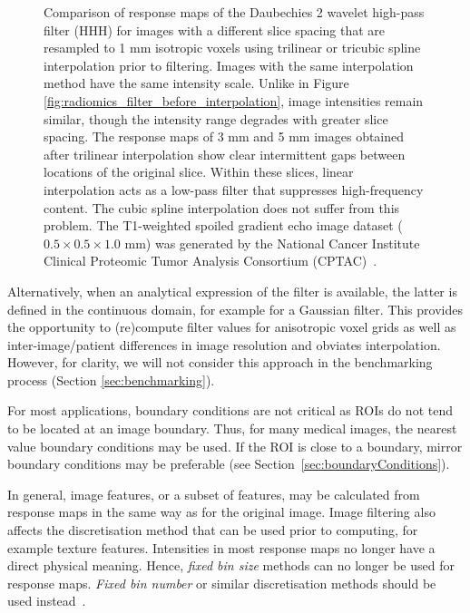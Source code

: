 \documentclass[fleqn,a4paper,oneside,openany]{book}
\begin{document}
\begin{figure}
\begin{minipage}[b]{150pt}
     \label{fig:radiomics_spline_5mm_high_pass}
     \hspace{100pt}
   \end{minipage}
  \caption{Comparison of response maps of the Daubechies 2 wavelet high-pass filter (HHH) for images with a different slice spacing that are resampled to 1 mm isotropic voxels using trilinear or tricubic spline interpolation prior to filtering. Images with the same interpolation method have the same intensity scale. Unlike in Figure \ref{fig:radiomics_filter_before_interpolation}, image intensities remain similar, though the intensity range degrades with greater slice spacing. The response maps of 3 mm and 5 mm images obtained after trilinear interpolation show clear intermittent gaps between locations of the original slice. Within these slices, linear interpolation acts as a low-pass filter that suppresses high-frequency content. The cubic spline interpolation does not suffer from this problem. The T1-weighted spoiled gradient echo image dataset (\(0.5 \times 0.5 \times 1.0\) mm) was generated by the National Cancer Institute Clinical Proteomic Tumor Analysis Consortium (CPTAC)~\cite{CPTAC2018-ot,Clark2013-sv}.
  }
  \label{fig:radiomics_filter_after_interpolation}
\end{figure}

Alternatively, when an analytical expression of the filter is available, the latter is defined in the continuous domain, for example for a Gaussian filter. This provides the opportunity to (re)compute filter values for anisotropic voxel grids as well as inter-image/patient differences in image resolution and obviates interpolation. However, for clarity, we will not consider this approach in the benchmarking process (Section \ref{sec:benchmarking}).

For most applications, boundary conditions are not critical as ROIs do not tend to be located at an image boundary. Thus, for many medical images, the nearest value boundary conditions may be used. If the ROI is close to a boundary, mirror boundary conditions may be preferable (see Section~\ref{sec:boundaryConditions}).

In general, image features, or a subset of features, may be calculated from response maps in the same way as for the original image. Image filtering also affects the discretisation method that can be used prior to computing, for example texture features. Intensities in most response maps no longer have a direct physical meaning. Hence, \textit{fixed bin size} methods can no longer be used for response maps. \textit{Fixed bin number} or similar discretisation methods should be used instead~\cite{ZLV2017}.
\end{document}
